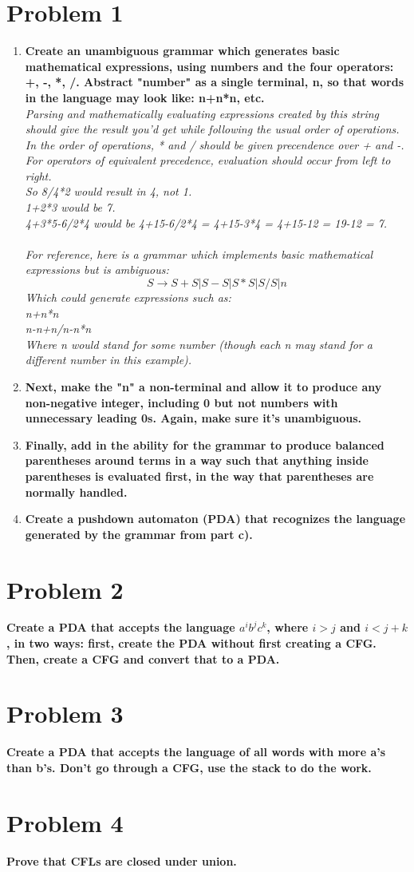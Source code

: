 \documentclass[11pt, a4paper]{article} %
\begin{document}
\section*{Problem 1}
\begin{enumerate}
  \item \textbf{Create an unambiguous grammar which generates basic
    mathematical expressions, using numbers and the four operators: +, -, *, /.
  Abstract "number" as a single terminal, n, so that words in the language may
  look like: n+n*n, etc.}
  \\
\emph{Parsing and mathematically evaluating expressions created by this string
  should give the result you'd get while following the usual order of
  operations. In the order of operations, * and / should be given precendence
  over + and -. For operators of equivalent precedence, evaluation should occur
  from left to right.\\
So 8/4*2 would result in 4, not 1.\\
1+2*3 would be 7.\\
4+3*5-6/2*4 would be 4+15-6/2*4 = 4+15-3*4 =  4+15-12 = 19-12 = 7.\\
\\
For reference, here is a grammar which implements basic mathematical
expressions but is ambiguous:\\
\[ S \rightarrow S+S | S-S | S*S | S/S | n \]
Which could generate expressions such as:\\
n+n*n\\
n-n+n/n-n*n\\
Where n would stand for some number (though each n may stand for a different
number in this example).\\
}
\item \textbf{Next, make the "n" a non-terminal and allow it to produce any
  non-negative integer, including 0 but not numbers with unnecessary leading
0s. Again, make sure it's unambiguous.}
  \item \textbf{Finally, add in the ability for the grammar to produce balanced
    parentheses around terms in a way such that anything inside parentheses
    is evaluated first, in the way that parentheses are normally handled.}
  \item \textbf{Create a pushdown automaton (PDA) that recognizes the language
    generated by the grammar from part c).}

\end{enumerate}
\newpage
\section*{Problem 2} \textbf{Create a PDA that accepts the language $a^ib^jc^k$,
  where $i>j$ and $i<j+k$, in two ways: first, create the PDA without first creating a CFG.
Then, create a CFG and convert that to a PDA.}
\newpage
\section*{Problem 3} \textbf{Create a PDA that accepts the language of all
  words with more a's than b's. Don't go through a CFG, use the stack to do the
  work.}
\newpage
\section*{Problem 4} \textbf{Prove that CFLs are closed under union.}
\end{document}
